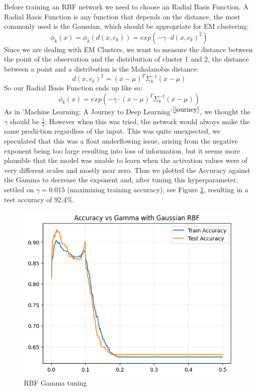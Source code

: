 \documentclass{article}
\begin{document}
\begin{enumerate}
Before training an RBF network we need to choose an Radial Basis Function.
A Radial Basis Function is any function that depends on the distance,
the most commonly used is the Gaussian, which should be appropriate for EM
clustering:
\begin{equation}
  \phi_k(x)=\phi_k(d(x,c_k))=exp(-\gamma \cdot d(x,c_k)^2)
\end{equation}
Since we are dealing with EM Clusters, we want to measure the distance between the point of the observation and the distribution of cluster 1 and 2, the distance between a point and a distribution is the Mahalanobis distance:
\begin{equation}
  d(x,c_k)^2=(x-\mu)^T\Sigma_k^{-1}(x-\mu)
\end{equation}
So our Radial Basis Function ends up like so:
\begin{equation}
  \phi_k(x)=exp(-\gamma \cdot (x-\mu)^T\Sigma_k^{-1}(x-\mu))
\end{equation}
As in 'Machine Learning: A Journey to Deep Learning'$^{\cite{journey}}$,
we thought the $\gamma$ should be $\frac{1}{2}$; However when this was
tried, the network would always make the same prediction regardless of
the input. This was quite unexpected, we speculated that this was a float
underflowing issue, arising from the negative exponent being too large
resulting into loss of information, but it seems more plausible
that the model was unable to learn when the activation values
were of very different scales and mostly near zero. Thus we plotted
the Accuracy against the Gamma to decrease the exponent and, after tuning 
this hyperparameter, settled on $\gamma = 0.015$ (maximizing training accuracy), see Figure
\ref{fig:gamma-tuning}, resulting in a test accuracy of 92.4\%.
\begin{figure}[H]
    \centering
    \includegraphics[width=0.5\linewidth]{img/GammaHyperparameterTuning.png}
    \caption{RBF Gamma tuning}
    \label{fig:gamma-tuning}
\end{figure}


\end{enumerate}
\end{document}
